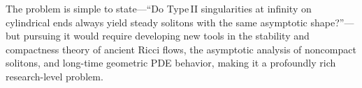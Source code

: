 The problem is simple to state—“Do Type II singularities at infinity on cylindrical ends always yield steady solitons with the same asymptotic shape?”—but pursuing it would require developing new tools in the stability and compactness theory of ancient Ricci flows, the asymptotic analysis of noncompact solitons, and long-time geometric PDE behavior, making it a profoundly rich research-level problem.
